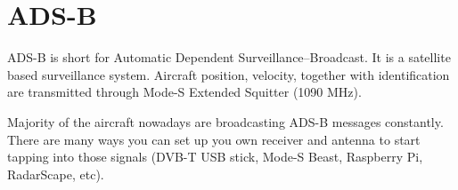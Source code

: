 \chapter{ADS-B}

ADS-B is short for Automatic Dependent Surveillance–Broadcast. It is a satellite based surveillance system. Aircraft position, velocity, together with identification are transmitted through Mode-S Extended Squitter (1090 MHz).

Majority of the aircraft nowadays are broadcasting ADS-B messages constantly. There are many ways you can set up you own receiver and antenna to start tapping into those signals (DVB-T USB stick, Mode-S Beast, Raspberry Pi, RadarScape, etc).
